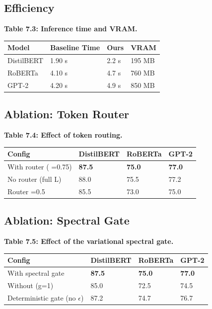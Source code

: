 \subsection{Efficiency}

\textbf{Table 7.3: Inference time and VRAM.}

\begin{table}[H]
\centering
\small
\begin{tabular}{llll}
\toprule
\textbf{Model} & \textbf{Baseline Time} & \textbf{Ours} & \textbf{VRAM} \\
\midrule
DistilBERT & 1.90 s & 2.2 s & 195 MB \\
RoBERTa & 4.10 s & 4.7 s & 760 MB \\
GPT-2 & 4.20 s & 4.9 s & 850 MB \\
\bottomrule
\end{tabular}
\end{table}

\subsection{Ablation: Token Router}

\textbf{Table 7.4: Effect of token routing.}

\begin{table}[H]
\centering
\small
\begin{tabular}{llll}
\toprule
\textbf{Config} & \textbf{DistilBERT} & \textbf{RoBERTa} & \textbf{GPT-2} \\
\midrule
With router ( =0.75) & \textbf{87.5} & \textbf{75.0} & \textbf{77.0} \\
No router (full L) & 88.0 & 75.5 & 77.2 \\
Router  =0.5 & 85.5 & 73.0 & 75.0 \\
\bottomrule
\end{tabular}
\end{table}

\subsection{Ablation: Spectral Gate}

\textbf{Table 7.5: Effect of the variational spectral gate.}

\begin{table}[H]
\centering
\small
\begin{tabular}{llll}
\toprule
\textbf{Config} & \textbf{DistilBERT} & \textbf{RoBERTa} & \textbf{GPT-2} \\
\midrule
With spectral gate & \textbf{87.5} & \textbf{75.0} & \textbf{77.0} \\
Without (g=1) & 85.0 & 72.5 & 74.5 \\
Deterministic gate (no $\epsilon$) & 87.2 & 74.7 & 76.7 \\
\bottomrule
\end{tabular}
\end{table}

